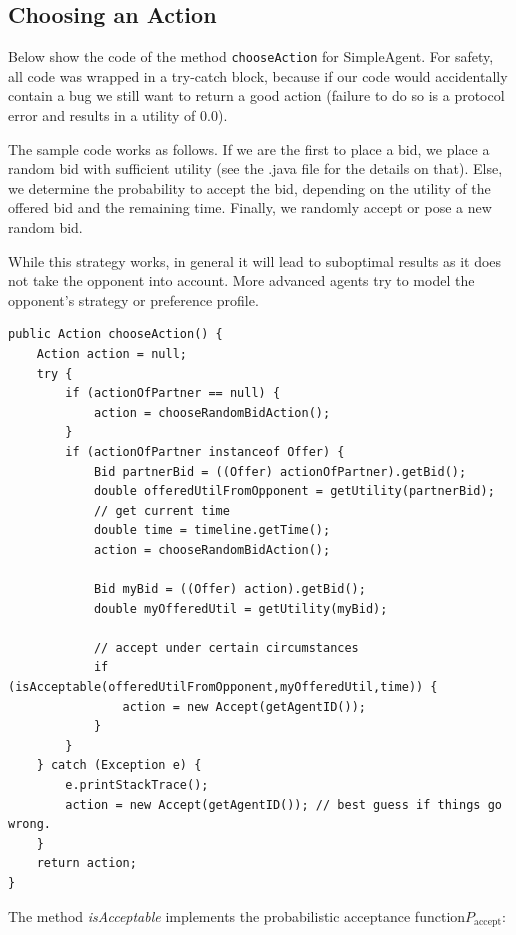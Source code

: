 \documentclass[]{article}
\begin{document}
\subsection{Choosing an Action}
Below show the code of the method \texttt{chooseAction} for SimpleAgent. For safety, all code was wrapped in a try-catch block, because if our code would accidentally contain a bug we still want to return a good action (failure to do so is a protocol error and results in a utility of 0.0).

The sample code works as follows. If we are the first to place a bid, we place a random bid with sufficient utility (see the .java file for the details on that). Else, we determine the probability to accept the bid, depending on the utility of the offered bid and the remaining time. Finally, we randomly accept or pose a new random bid.

While this strategy works, in general it will lead to suboptimal results as it does not take the opponent into account. More advanced agents try to model the opponent's strategy or preference profile.

\begin{lstlisting}
public Action chooseAction() {
	Action action = null;
	try { 
		if (actionOfPartner == null) {
			action = chooseRandomBidAction();
		}
		if (actionOfPartner instanceof Offer) {
			Bid partnerBid = ((Offer) actionOfPartner).getBid();
			double offeredUtilFromOpponent = getUtility(partnerBid);
			// get current time
			double time = timeline.getTime();
			action = chooseRandomBidAction();
			
			Bid myBid = ((Offer) action).getBid();
			double myOfferedUtil = getUtility(myBid);
			
			// accept under certain circumstances
			if (isAcceptable(offeredUtilFromOpponent,myOfferedUtil,time)) {
				action = new Accept(getAgentID());
			}
		}
	} catch (Exception e) { 
		e.printStackTrace();
		action = new Accept(getAgentID()); // best guess if things go wrong. 
	}
	return action;
}
\end{lstlisting}

The method \textit{isAcceptable} implements the probabilistic acceptance function$P_\text{accept}$:
\end{document}
